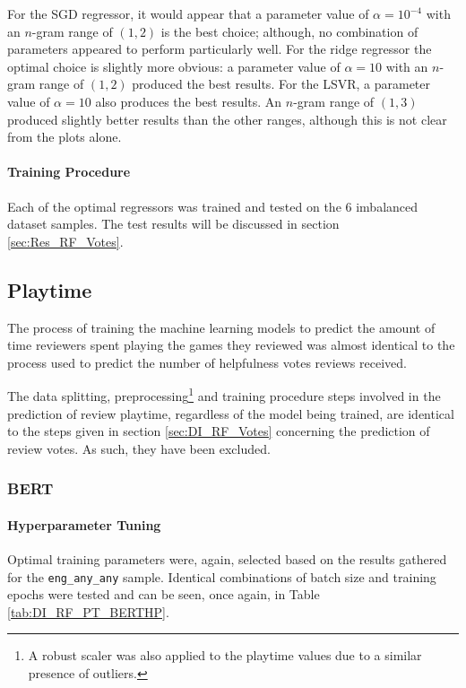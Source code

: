 For the SGD regressor, it would appear that a parameter value of $\alpha=10^{-4}$ with an $n$-gram range of $(1, 2)$ is the best choice; although, no combination of parameters appeared to perform particularly well. For the ridge regressor the optimal choice is slightly more obvious: a parameter value of $\alpha=10$ with an $n$-gram range of $(1, 2)$ produced the best results. For the LSVR, a parameter value of $\alpha=10$ also produces the best results. An $n$-gram range of $(1, 3)$ produced slightly better results than the other ranges, although this is not clear from the plots alone.

\paragraph{Training Procedure}

Each of the optimal regressors was trained and tested on the 6 imbalanced dataset samples. The test results will be discussed in section \ref{sec:Res_RF_Votes}.

\subsection{Playtime} \label{sec:DI_RF_PT}

The process of training the machine learning models to predict the amount of time reviewers spent playing the games they reviewed was almost identical to the process used to predict the number of helpfulness votes reviews received.

The data splitting, preprocessing\footnote{A robust scaler was also applied to the playtime values due to a similar presence of outliers.} and training procedure steps involved in the prediction of review playtime, regardless of the model being trained, are identical to the steps given in section \ref{sec:DI_RF_Votes} concerning the prediction of review votes. As such, they have been excluded.

\subsubsection{BERT}

\paragraph{Hyperparameter Tuning}

Optimal training parameters were, again, selected based on the results gathered for the \texttt{eng\_any\_any} sample. Identical combinations of batch size and training epochs were tested and can be seen, once again, in Table \ref{tab:DI_RF_PT_BERTHP}.

